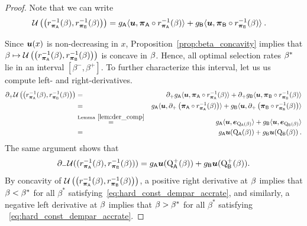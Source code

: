 		\begin{proof}  Note that we can write 
		\begin{eqnarray*}
		\mathcal{U}\left(\left(r_{\boldsymbol{\pi}_{\mathsf{A}}}^{-1}(\beta),r_{\boldsymbol{\pi}_{\mathsf{B}}}^{-1}(\beta)\right)\right)  &= g_{\mathsf{A}}\langle \boldsymbol{u}, \boldsymbol{\pi}_{\mathsf{A}} \circ  r_{\boldsymbol{\pi}_{\mathsf{A}}}^{-1}(\beta) \rangle + g_{\mathsf{B}}\langle \boldsymbol{u}, \boldsymbol{\pi}_{\mathsf{B}} \circ  r_{\boldsymbol{\pi}_{\mathsf{B}}}^{-1}(\beta) \rangle \:.
		\end{eqnarray*}

		Since $\boldsymbol{u}(x)$ is non-decreasing in $x$, Proposition~\ref{prop:beta_concavity} implies that $\beta \mapsto \mathcal{U}\left(\left(r_{\boldsymbol{\pi}_{\mathsf{A}}}^{-1}(\beta),r_{\boldsymbol{\pi}_{\mathsf{B}}}^{-1}(\beta)\right)\right)$ is concave in $\beta$. Hence, all optimal selection rates $\beta^*$ lie in an interval $[\beta^-,\beta^+]$. To further characterize this interval, let us us compute left- and right-derivatives.
		\begin{eqnarray*}
		\partial_+ \mathcal{U}\left(\left(r_{\boldsymbol{\pi}_{\mathsf{A}}}^{-1}(\beta),r_{\boldsymbol{\pi}_{\mathsf{B}}}^{-1}(\beta)\right)\right) &=& 
		\partial_+ g_{\mathsf{A}}\langle \boldsymbol{u}, \boldsymbol{\pi}_{\mathsf{A}} \circ r_{\boldsymbol{\pi}_{\mathsf{A}}}^{-1}(\beta) \rangle + \partial_+ g_{\mathsf{B}}  \langle \boldsymbol{u} , \boldsymbol{\pi}_{\mathsf{B}} \circ r_{\boldsymbol{\pi}_{\mathsf{B}}}^{-1}(\beta) \rangle\\
		&=& g_{\mathsf{A}}\langle \boldsymbol{u}, \partial_+ \left( \boldsymbol{\pi}_{\mathsf{A}} \circ r_{\boldsymbol{\pi}_{\mathsf{A}}}^{-1}(\beta) \right)\rangle + g_{\mathsf{B}} \langle \boldsymbol{u} , \partial_+  \left( \boldsymbol{\pi}_{\mathsf{B}} \circ r_{\boldsymbol{\pi}_{\mathsf{B}}}^{-1}(\beta) \right) \rangle\\
		&\overset{\text{Lemma}~\ref{lem:der_comp}}{=}& g_{\mathsf{A}}\langle \boldsymbol{u}, \boldsymbol{e}_{\mathrm{Q}_{\mathsf{A}}(\beta)}  \rangle + g_{\mathsf{B}} \langle \boldsymbol{u} ,  \boldsymbol{e}_{\mathrm{Q}_{\mathsf{B}}(\beta)}  \rangle\\
		&=& g_{\mathsf{A}} \boldsymbol{u}(\mathrm{Q}_{\mathsf{A}}(\beta))  + g_{\mathsf{B}} \boldsymbol{u}(\mathrm{Q}_{\mathsf{B}}(\beta))\:.
		\end{eqnarray*}
		The same argument shows that 
		\begin{eqnarray*}
		\partial_- \mathcal{U}((r_{\boldsymbol{\pi}_{\mathsf{A}}}^{-1}(\beta),r_{\boldsymbol{\pi}_{\mathsf{B}}}^{-1}(\beta))) = g_{\mathsf{A}} \boldsymbol{u}(\mathrm{Q}^+_{\mathsf{A}}(\beta))  + g_{\mathsf{B}} \boldsymbol{u}(\mathrm{Q}^+_{\mathsf{B}}(\beta)).	\end{eqnarray*} 
		By concavity of $\mathcal{U}\left(\left(r_{\boldsymbol{\pi}_{\mathsf{A}}}^{-1}(\beta),r_{\boldsymbol{\pi}_{\mathsf{B}}}^{-1}(\beta)\right)\right)$, a positive right derivative at $\beta$ implies that $\beta <  \beta^*$ for all $\beta^*$ satisfying~\eqref{eq:hard_const_dempar_accrate}, and similarly, a negative left derivative at $\beta$ implies that $\beta >  \beta^*$ for all $\beta^*$ satisfying ~\eqref{eq:hard_const_dempar_accrate}.
	
		\end{proof}
		
